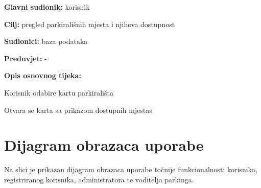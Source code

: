 					\noindent {}
					\begin{packed_item}
						
						\item \textbf{Glavni sudionik: }korisnik
						\item  \textbf{Cilj:} pregled parkirališnih mjesta i njihova dostupnost
						\item  \textbf{Sudionici:} baza podataka
						\item  \textbf{Preduvjet:} -
						\item  \textbf{Opis osnovnog tijeka:}
						
						\item[] \begin{packed_enum}
							
							\item  Korisnik odabire kartu parkirališta
							\item  Otvara se karta sa prikazom dostupnih mjestas
						\end{packed_enum}

					\end{packed_item}
				

				\section{Dijagram obrazaca uporabe} 
			
			{ Na slici je prikazan dijagram obrazaca uporabe točnije funkcionalnosti korisnika, registriranog korisnika, administratora te voditelja parkinga. }
				
			\begin{figure}[]
				\centering
				\label{fig:UseCaseDijagram}
			\end{figure}
			\pagebreak
					
